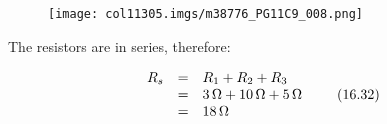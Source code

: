           \label{m38776*id64722}
    \setcounter{subfigure}{0}
	\begin{figure}[H] %
    \begin{center}
    \label{m38776*id64726!!!underscore!!!media}\label{m38776*id64726!!!underscore!!!printimage}\texttt{[image: col11305.imgs/m38776\_PG11C9\_008.png]} %
      \vspace{2pt}
    \vspace{.1in}
    \end{center}
 \end{figure}       
          \par 
          \label{m38776*id64732}The resistors are in series, therefore:\par 
          \label{m38776*id64736}\nopagebreak\noindent{}
    \begin{equation}
    \begin{array}{ccc}\hfill {R}_{s}& =& {R}_{1}+{R}_{2}+{R}_{3}\hfill \\ & =& 3\phantom{\rule{0.166667em}{0ex}}\mathrm{\Omega }+10\phantom{\rule{0.166667em}{0ex}}\mathrm{\Omega }+5\phantom{\rule{0.166667em}{0ex}}\mathrm{\Omega }\hfill \\ & =& 18\phantom{\rule{0.166667em}{0ex}}\mathrm{\Omega }\hfill \end{array}\tag{16.32}
      \end{equation}
\label{m38776*eip-186}

